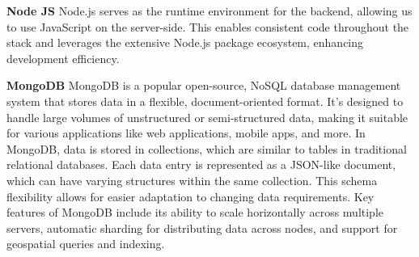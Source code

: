 \textbf{Node JS}\newline
Node.js serves as the runtime environment for the backend, allowing us to use JavaScript on the server-side. This enables consistent code throughout the stack and leverages the extensive Node.js package ecosystem, enhancing development efficiency.

 \textbf{MongoDB}\newline
 MongoDB is a popular open-source, NoSQL database management system that stores data in a flexible, document-oriented format. It's designed to handle large volumes of unstructured or semi-structured data, making it suitable for various applications like web applications, mobile apps, and more. In MongoDB, data is stored in collections, which are similar to tables in traditional relational databases. Each data entry is represented as a JSON-like document, which can have varying structures within the same collection. This schema flexibility allows for easier adaptation to changing data requirements. Key features of MongoDB include its ability to scale horizontally across multiple servers, automatic sharding for distributing data across nodes, and support for geospatial queries and indexing.
